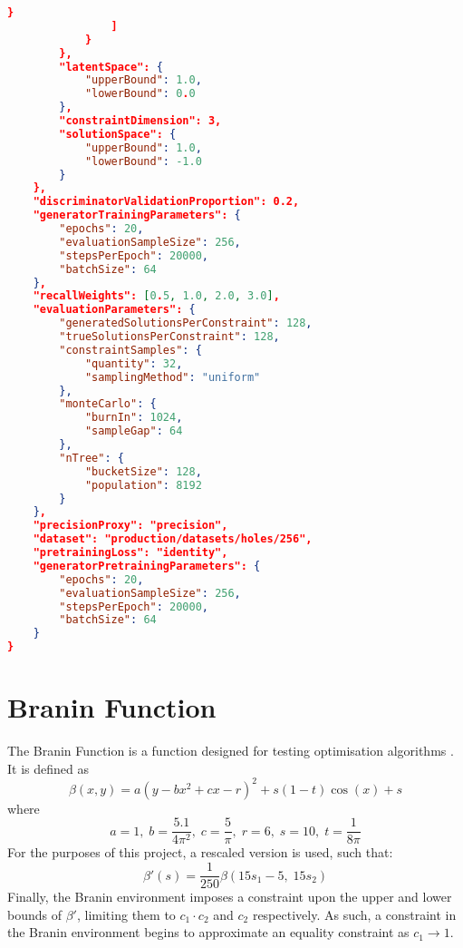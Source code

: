 \documentclass[../main.tex]{subfiles}
\begin{document}
\begin{lstlisting}[language=json,firstnumber=1,caption={Experimental parameters for training a generator on the holes environment.},captionpos=b]
                    }
                ]
            }
        },
        "latentSpace": {  
            "upperBound": 1.0,
            "lowerBound": 0.0
        },
        "constraintDimension": 3,
        "solutionSpace": {  
            "upperBound": 1.0,
            "lowerBound": -1.0
        }
    },
    "discriminatorValidationProportion": 0.2,
    "generatorTrainingParameters": {  
        "epochs": 20,
        "evaluationSampleSize": 256,
        "stepsPerEpoch": 20000,
        "batchSize": 64
    },
    "recallWeights": [0.5, 1.0, 2.0, 3.0],
    "evaluationParameters": {  
        "generatedSolutionsPerConstraint": 128,
        "trueSolutionsPerConstraint": 128,
        "constraintSamples": {  
            "quantity": 32,
            "samplingMethod": "uniform"
        },
        "monteCarlo": {  
            "burnIn": 1024,
            "sampleGap": 64
        },
        "nTree": {  
            "bucketSize": 128,
            "population": 8192
        }
    },
    "precisionProxy": "precision",
    "dataset": "production/datasets/holes/256",
    "pretrainingLoss": "identity",
    "generatorPretrainingParameters": {  
        "epochs": 20,
        "evaluationSampleSize": 256,
        "stepsPerEpoch": 20000,
        "batchSize": 64
    }
}
\end{lstlisting}

\section{Branin Function} \label{appendix:braninFunction}

The Branin Function is a function designed for testing optimisation algorithms \cite{bingham17}.
It is defined as
\begin{equation}
    \beta(x,y)=a(y-bx^2+cx-r)^2+s(1-t)\cos(x)+s
\end{equation}
where
\begin{equation}
    a=1,\;b=\frac{5.1}{4\pi^2},\;c=\frac{5}{\pi},\;r=6,\;s=10,\;t=\frac{1}{8\pi}
\end{equation}
For the purposes of this project, a rescaled version is used, such that:
\begin{equation}
    \beta'(s)=\frac{1}{250}\beta(15s_1-5,\;15s_2)
\end{equation}
Finally, the Branin environment imposes a constraint upon the upper and lower bounds of $\beta'$, limiting them to $c_1\cdot c_2$ and $c_2$ respectively.
As such, a constraint in the Branin environment begins to approximate an equality constraint as $c_1\to1$.
\end{document}
